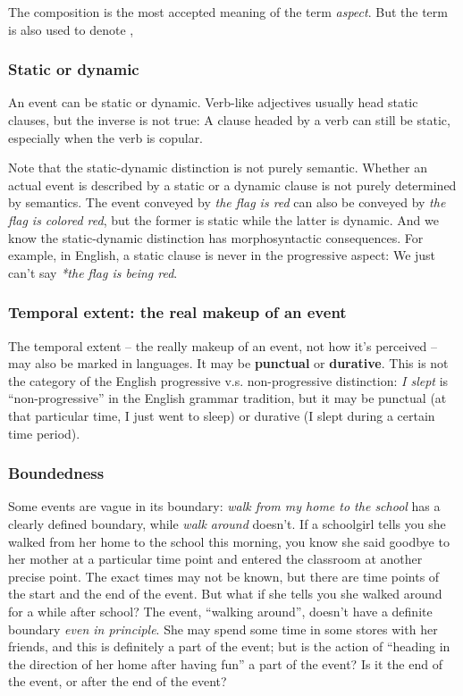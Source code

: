 \documentclass[UTF8, a4paper, oneside, scheme=plain]{ctexart}
\newcommand*{\concept}[1]{\textbf{#1}}
\newcommand*{\term}[1]{\emph{#1}}
\newcommand*{\corpus}[1]{\emph{#1}}
\begin{document}
The composition is the most accepted meaning of the term \term{aspect}.
But the term is also used to denote 
, 

\subsubsection{Static or dynamic}

An event can be static or dynamic.
Verb-like adjectives usually head static clauses,
but the inverse is not true:
A clause headed by a verb can still be static, especially when the verb is copular.

Note that the static-dynamic distinction is not purely semantic.
Whether an actual event is described by a static or a dynamic clause 
is not purely determined by semantics.
The event conveyed by \corpus{the flag is red} 
can also be conveyed by \corpus{the flag is colored red},
but the former is static while the latter is dynamic.
And we know the static-dynamic distinction has morphosyntactic consequences.
For example, in English, a static clause is never in the progressive aspect:
We just can't say \corpus{*the flag is being red}.

\subsubsection{Temporal extent: the real makeup of an event}

The temporal extent -- the really makeup of an event, not how it's perceived -- 
may also be marked in languages.
It may be \concept{punctual} or \concept{durative}.
This is not the category of the English progressive v.s. non-progressive distinction:
\corpus{I slept} is ``non-progressive'' in the English grammar tradition,
but it may be punctual (at that particular time, I just went to sleep) 
or durative (I slept during a certain time period).

\subsubsection{Boundedness}

Some events are vague in its boundary:
\corpus{walk from my home to the school} has a clearly defined boundary,
while \corpus{walk around} doesn't.
If a schoolgirl tells you she walked from her home to the school this morning,
you know she said goodbye to her mother at a particular time point 
and entered the classroom at another precise point.
The exact times may not be known,
but there are time points of the start and the end of the event.
But what if she tells you she walked around for a while after school?
The event, ``walking around'', doesn't have a definite boundary
\emph{even in principle}.
She may spend some time in some stores with her friends,
and this is definitely a part of the event;
but is the action of ``heading in the direction of her home after having fun''
a part of the event?
Is it the end of the event, or after the end of the event?
\end{document}
